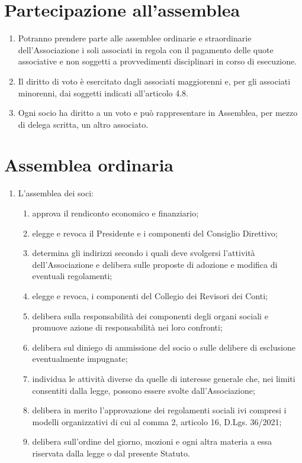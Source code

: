 \documentclass{djtsdoc}
\begin{document}
	\section{Partecipazione all'assemblea}
	\begin{enumerate}
		\item Potranno prendere parte alle assemblee ordinarie e straordinarie dell'Associazione i soli associati in regola con il pagamento delle quote associative e non soggetti a provvedimenti disciplinari in corso di esecuzione.
		\item Il diritto di voto è esercitato dagli associati maggiorenni e, per gli associati minorenni, dai soggetti indicati all'articolo 4.8.
		\item Ogni socio ha diritto a un voto e può rappresentare in Assemblea, per mezzo di delega scritta, un altro associato.
	\end{enumerate}

	\section{Assemblea ordinaria}
	\begin{enumerate}
		\item L'assemblea dei soci:
		\begin{enumerate}
			\item approva il rendiconto economico e finanziario;
			\item elegge  e revoca il Presidente e i componenti del Consiglio Direttivo;
			\item determina gli indirizzi secondo i quali deve svolgersi l'attività dell'Associazione e delibera sulle proposte di adozione e modifica di eventuali regolamenti;
			\item elegge e revoca, i componenti  del Collegio dei Revisori dei Conti;
			\item delibera sulla responsabilità dei componenti degli organi sociali e promuove azione di responsabilità nei loro confronti;
			\item delibera sul diniego di ammissione del socio o sulle delibere di esclusione eventualmente impugnate;
			\item individua le attività diverse da quelle di interesse generale che, nei limiti consentiti dalla legge, possono essere svolte dall'Associazione;
			\item delibera in merito l'approvazione dei regolamenti sociali ivi compresi i modelli organizzativi di cui al comma 2, articolo 16, D.Lgs. 36/2021;
			\item delibera sull'ordine del giorno, mozioni e ogni altra materia a essa riservata dalla legge o dal presente Statuto.
		\end{enumerate}
	\end{enumerate}
	
\end{document}
